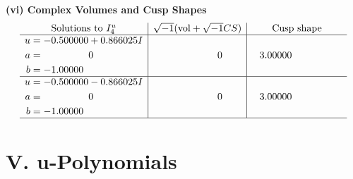 \documentclass[1p]{elsarticle_modified}
\theoremstyle{definition}
\newcommand{\I}{\sqrt{-1}}
\begin{document}
\newpage\flushleft \textbf{(vi) Complex Volumes and Cusp Shapes}
$$\begin{array}{c|c|c}  
\text{Solutions to }I^u_{4}& \I (\text{vol} + \sqrt{-1}CS) & \text{Cusp shape}\\
 \hline 
\begin{aligned}
u &= -0.500000 + 0.866025 I \\
a &= \phantom{-0.000000 } 0 \\
b &= -1.00000\phantom{ +0.000000I}\end{aligned}
 & \phantom{-0.000000 } 0 & \phantom{-}3.00000\phantom{ +0.000000I} \\ \hline\begin{aligned}
u &= -0.500000 - 0.866025 I \\
a &= \phantom{-0.000000 } 0 \\
b &= -1.00000\phantom{ +0.000000I}\end{aligned}
 & \phantom{-0.000000 } 0 & \phantom{-}3.00000\phantom{ +0.000000I}\\
 \hline 
 \end{array}$$\newpage
\newpage\renewcommand{\arraystretch}{1}
\centering \section*{ V. u-Polynomials}
\end{document}
